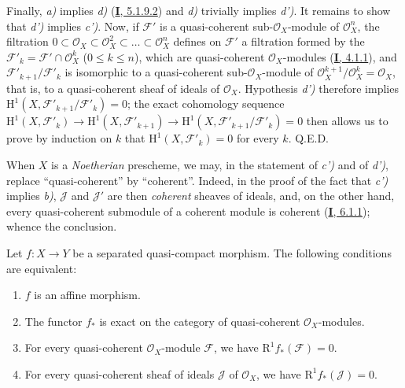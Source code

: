 Finally, \emph{a)} implies \emph{d)} (\hyperref[I.5.1.9.2]{\textbf{I}, 5.1.9.2}) and \emph{d)}
trivially implies \emph{d')}. It remains to show that \emph{d')} implies \emph{c')}. Now, if
$\mathcal{F}'$ is a quasi-coherent sub-$\mathcal{O}_X$-module of
$\mathcal{O}_X^n$, the filtration
$0\subset\mathcal{O}_X\subset\mathcal{O}_X^2\subset\ldots\subset
\mathcal{O}_X^n$ defines on $\mathcal{F}'$ a filtration formed by the
$\mathcal{F}'_k=\mathcal{F}'\cap\mathcal{O}_X^k$ ($0\leq k\leq n$), which
are quasi-coherent $\mathcal{O}_X$-modules
(\hyperref[I.4.1.1]{\textbf{I}, 4.1.1}), and
$\mathcal{F}'_{k+1}/\mathcal{F}'_k$ is isomorphic to a quasi-coherent
sub-$\mathcal{O}_X$-module of
$\mathcal{O}_X^{k+1}/\mathcal{O}_X^k=\mathcal{O}_X$, that is, to a
quasi-coherent sheaf of ideals of $\mathcal{O}_X$. Hypothesis \emph{d')}
therefore implies
$\mathrm{H}^1(X,\mathcal{F}'_{k+1}/\mathcal{F}'_k)=0$; the exact cohomology
sequence
$\mathrm{H}^1(X,\mathcal{F}'_k)\to\mathrm{H}^1(X,\mathcal{F}'_{k+1})
\to\mathrm{H}^1(X,\mathcal{F}'_{k+1}/\mathcal{F}'_k)=0$ then allows us to
prove by induction on $k$ that
$\mathrm{H}^1(X,\mathcal{F}'_k)=0$ for every $k$. Q.E.D.

\begin{remark}[5.2.1.1]
\label{II.5.2.1.1}
When $X$ is a \emph{Noetherian} prescheme, we may, in the statement of \emph{c')} and of
\emph{d')}, replace ``quasi-coherent'' by ``coherent''. Indeed, in the proof of
the fact that \emph{c')} implies \emph{b)}, $\mathcal{J}$ and $\mathcal{J}'$
are then \emph{coherent} sheaves of ideals, and, on the other hand, every
quasi-coherent submodule of a coherent module is coherent
(\hyperref[I.6.1.1]{\textbf{I}, 6.1.1}); whence the conclusion.
\end{remark}

\begin{corollary}[5.2.2]
\label{II.5.2.2}
Let $f:X\to Y$ be a separated quasi-compact morphism. The following
conditions are equivalent:
\begin{enumerate}
  \item[\rm{a)}] $f$ is an affine morphism.
  \item[\rm{b)}] The functor $f_*$ is exact on the category of
  quasi-coherent $\mathcal{O}_X$-modules.
  \item[\rm{c)}] For every quasi-coherent $\mathcal{O}_X$-module
  $\mathcal{F}$, we have $\mathrm{R}^1f_*(\mathcal{F})=0$.
  \item[\rm{c')}] For every quasi-coherent sheaf of ideals $\mathcal{J}$
  of $\mathcal{O}_X$, we have $\mathrm{R}^1f_*(\mathcal{J})=0$.
\end{enumerate}
\end{corollary}


